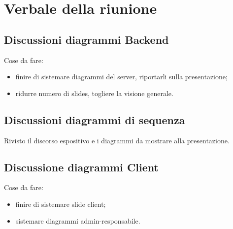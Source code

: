 \section{Verbale della riunione}

\subsection{Discussioni diagrammi Backend}
Cose da fare:
	\begin{itemize}
		\item finire di sistemare diagrammi del server, riportarli sulla presentazione;
		\item ridurre numero di slides, togliere la visione generale.
	\end{itemize}

\subsection{Discussioni diagrammi di sequenza}
Rivisto il discorso espositivo e i diagrammi da mostrare alla presentazione.

\subsection{Discussione diagrammi Client}
Cose da fare:
\begin{itemize}
	\item finire di sistemare slide client;
	\item sistemare diagrammi admin-responsabile.
\end{itemize}